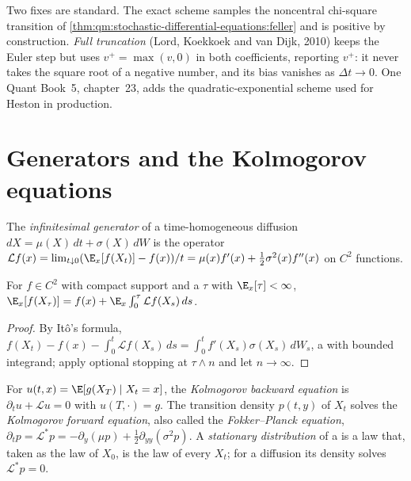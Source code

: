 Two fixes are standard. The exact scheme samples the noncentral chi-square transition of
\cref{thm:qm:stochastic-differential-equations:feller} and is positive by construction.
\emph{Full truncation} (Lord, Koekkoek and van Dijk, 2010) keeps the Euler step but uses $v^+ =
\max(v, 0)$ in both coefficients, reporting $v^+$: it never takes the square root of a negative
number, and its bias vanishes as $\Delta t \to 0$. One Quant Book~5, chapter~23, adds the
quadratic-exponential scheme used for Heston in production.

\section{Generators and the Kolmogorov equations}

\begin{definition}\label{def:qm:stochastic-differential-equations:generator}
The \emph{infinitesimal generator} of a time-homogeneous
diffusion $dX = \mu(X)\,dt + \sigma(X)\,dW$ is the operator $\mathcal Lf(x) = \lim_{t\downarrow 0}
(\E_x[f(X_t)] - f(x))/t = \mu(x)f'(x) + \tfrac12\sigma^2(x)f^{\prime\prime}(x)$ on $C^2$ functions.
\end{definition}

\begin{proposition}\label{prop:qm:stochastic-differential-equations:dynkin}
For $f \in C^2$ with compact support and a  $\tau$ with $\E_x[\tau] < \infty$,
$\E_x[f(X_\tau)] = f(x) + \E_x\int_0^\tau\mathcal Lf(X_s)\,ds$.
\end{proposition}

\begin{proof}
By Itô's formula, $f(X_t) - f(x) - \int_0^t\mathcal Lf(X_s)\,ds = \int_0^tf'(X_s)\sigma(X_s)\,dW_s$, a
 with bounded integrand; apply optional stopping at $\tau \wedge n$ and let $n \to \infty$.
\end{proof}

\begin{definition}\label{def:qm:stochastic-differential-equations:kolmogorov}
For $u(t, x) = \E[g(X_T) \mid X_t = x]$, the \emph{Kolmogorov backward equation} is $\partial_tu + \mathcal Lu = 0$ with $u(T, \cdot) = g$. The transition density
$p(t, y)$ of $X_t$ solves the \emph{Kolmogorov forward equation},
also called the \emph{Fokker--Planck equation}, $\partial_tp =
\mathcal L^*p = -\partial_y(\mu p) + \tfrac12\partial_{yy}(\sigma^2p)$. A \emph{stationary
distribution} of a  is a law that, taken as the law of
$X_0$, is the law of every $X_t$; for a diffusion its density solves $\mathcal L^*p = 0$.
\end{definition}

